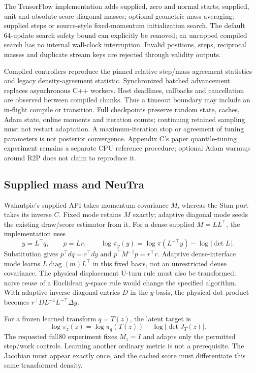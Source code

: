 The TensorFlow implementation adds supplied, zero and normal starts;
supplied, unit and absolute-score diagonal masses; optional geometric mass
averaging; supplied steps or source-style fixed-momentum initialization
search. The default 64-update search safety bound can explicitly be removed;
an uncapped compiled search has no internal wall-clock interruption.
Invalid positions, steps, reciprocal masses and duplicate stream keys
are rejected through validity outputs.

Compiled controllers reproduce the pinned relative step/mass agreement
statistics and legacy density-agreement statistic. Synchronized batched
advancement replaces asynchronous C++ workers. Host deadlines, callbacks
and cancellation are observed between compiled chunks. Thus a timeout
boundary may include an in-flight compile or transition. Full checkpoints
preserve random state, caches, Adam state, online moments and iteration
counts; continuing retained sampling must not restart adaptation. A
maximum-iteration stop or agreement of tuning parameters is not posterior
convergence. Appendix C's paper quantile-tuning experiment remains a
separate CPU reference procedure; optional Adam warmup around R2P does
not claim to reproduce it.

\subsection{Supplied mass and NeuTra}

Walnutpie's supplied API takes momentum covariance $M$, whereas the Stan
port takes its inverse $C$. Fixed mode retains $M$ exactly; adaptive
diagonal mode seeds the existing draw/score estimator from it. For a dense
supplied $M=LL^\top$, the implementation uses
\begin{equation}
 y=L^\top q,\qquad p=Lr,\qquad
 \log\pi_y(y)=\log\pi(L^{-\top}y)-\log|\det L|.
 \label{eq:sw-dense-mass}
\end{equation}
Substitution gives $p^\top dq=r^\top dy$ and
$p^\top M^{-1}p=r^\top r$. Adaptive dense-interface mode learns
$L\operatorname{diag}(m)L^\top$ in this fixed basis, not an unrestricted
dense covariance. The physical displacement U-turn rule must also be
transformed; naive reuse of a Euclidean $y$-space rule would change the
specified algorithm. With adaptive inverse diagonal entries $D$ in the
$y$ basis, the physical dot product becomes
$r^\top D L^{-1}L^{-\top}\Delta y$.

For a frozen learned transform $q=T(z)$, the latent target is
\begin{equation}
 \log\pi_z(z)=\log\pi_q(T(z))+\log|\det J_T(z)|.
 \label{eq:sw-neutra-target}
\end{equation}
The requested full80 experiment fixes $M_z=I$ and adapts only the permitted
step/work controls. Learning another ordinary metric is not a prerequisite.
The Jacobian must appear exactly once, and the cached score must differentiate
this same transformed density.

